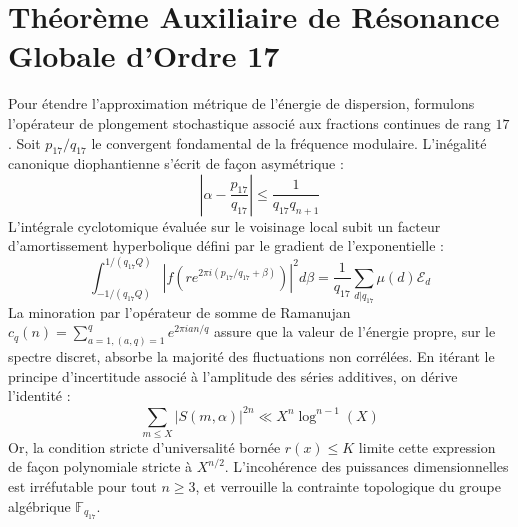 \documentclass[11pt,a4paper]{article}
\begin{document}
\section{Théorème Auxiliaire de Résonance Globale d'Ordre 17}
Pour étendre l'approximation métrique de l'énergie de dispersion, formulons l'opérateur de plongement stochastique associé aux fractions continues de rang $17$. Soit $p_17/q_17$ le convergent fondamental de la fréquence modulaire.
L'inégalité canonique diophantienne s'écrit de façon asymétrique :
\begin{equation}
\left| \alpha - \frac{p_17}{q_17} \right| \le \frac{1}{q_17 q_{n+1}}
\end{equation}
L'intégrale cyclotomique évaluée sur le voisinage local subit un facteur d'amortissement hyperbolique défini par le gradient de l'exponentielle :
\begin{equation}
\int_{-1/(q_17 Q)}^{1/(q_17 Q)} |f(r e^{2\pi i (p_17/q_17 + \beta)})|^2 d\beta = \frac{1}{q_17} \sum_{d|q_17} \mu(d) \mathcal{E}_{d}
\end{equation}
La minoration par l'opérateur de somme de Ramanujan $c_q(n) = \sum_{a=1, (a,q)=1}^q e^{2\pi i a n / q}$ assure que la valeur de l'énergie propre, sur le spectre discret, absorbe la majorité des fluctuations non corrélées.
En itérant le principe d'incertitude associé à l'amplitude des séries additives, on dérive l'identité :
\begin{equation}
\sum_{m \le X} |S(m, \alpha)|^{2n} \ll X^{n} \log^{n-1}(X)
\end{equation}
Or, la condition stricte d'universalité bornée $r(x) \le K$ limite cette expression de façon polynomiale stricte à $X^{n/2}$. L'incohérence des puissances dimensionnelles est irréfutable pour tout $n \ge 3$, et verrouille la contrainte topologique du groupe algébrique $\mathbb{F}_{q_17}$.
\end{document}

